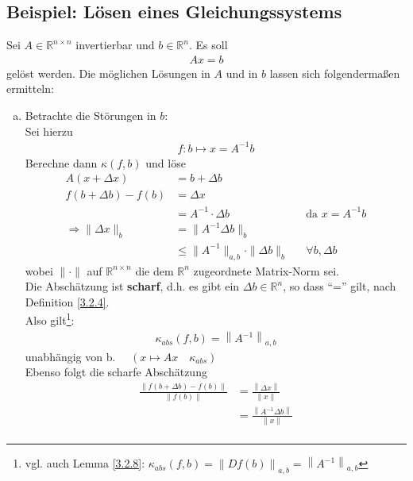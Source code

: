 \documentclass[ngerman,fontsize=11pt, paper=a4, parskip=half, titlepage=true, toc=bib]{scrbook}
\newcommand{\R}{\mathds{R}}
\newcommand{\Ren}{\mathds{R}^{n}}
\newcommand{\Renn}{\mathds{R}^{n\times n}}
\newcommand{\nn}[1]{\left\| #1 \right\|}
\begin{document}
  \subsection{Beispiel: Lösen eines Gleichungssystems} \label{3.2.10}
  Sei $A\in \R^{n\times n}$ invertierbar und $b\in \R^n$. Es soll 
  \begin{gather*}
    Ax =b
  \end{gather*}
  gelöst werden.
  Die möglichen Lösungen in $A$ und in $b$ lassen sich folgendermaßen ermitteln:
  \begin{enumerate}[a)]
  \item Betrachte die Störungen in $b$:\\
    Sei hierzu
    \begin{gather*}
      f: b\mapsto x= A^{-1}b 
    \end{gather*}
    Berechne dann $ \kappa(f,b)$ und löse 
    \begin{align*}
      A(x + \Delta x) &= b+\Delta b \\
      f(b + \Delta b) - f(b) &= \Delta x \\
                      &= A^{-1} \cdot \Delta b && \text{da }x = A^{-1}b \\
      \Rightarrow \|\Delta x\|_{b}  &= \|A^{-1}\Delta b\|_{b} \\
                      &\leq \|A^{-1}\|_{a,b}\cdot \|\Delta b\|_{b} && \forall b, \Delta b 
    \end{align*}
    wobei $\|\cdot\| $ auf $\Renn$ die dem $\Ren$ zugeordnete Matrix-Norm sei. \\
    Die Abschätzung ist \textbf{scharf}, d.h. es gibt ein $\Delta b\in \R^n$, so dass \enquote{=} gilt, nach Definition \ref{3.2.4}. \\
    Also gilt\footnote{vgl. auch Lemma \ref{3.2.8}: $\kappa_{abs}(f,b)=\nn{Df(b)}_{a,b}=\nn{A^{-1}}_{a,b}$}:
    \begin{gather}
      \kappa_{abs}(f,b) = \nn{A^{-1}}_{a,b} \label{III.2.6}
    \end{gather}
    unabhängig von b.  $ \quad \left( x\mapsto Ax \quad \kappa_{abs}\right)$\\
    Ebenso folgt die scharfe Abschätzung 
    \begin{align}
      \nonumber
      \frac{\|	f(b + \Delta b) - f(b)\|}{\|f(b)\|} &= \frac{\nn{\Delta x}}{\nn{x}}\\ \nonumber
                                                    & = \frac{\nn{A^{-1}\Delta b}}{\nn{x}} \\ \nonumber

\end{align}
\end{enumerate}
\end{document}
